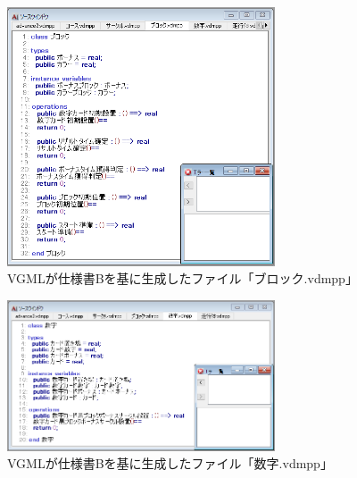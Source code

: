 \begin{figure}[tp]
    \begin{center}
    \includegraphics[width=300]{image/indicationB_vdm4.PNG}
    \caption{VGMLが仕様書Bを基に生成したファイル「ブロック.vdmpp」}
    \label{fig:indicationB_vdm4}
    \end{center}
\end{figure}

\begin{figure}[tp]
    \begin{center}
    \includegraphics[width=300]{image/indicationB_vdm5.PNG}
    \caption{VGMLが仕様書Bを基に生成したファイル「数字.vdmpp」}
    \label{fig:indicationB_vdm5}
    \end{center}
\end{figure}

